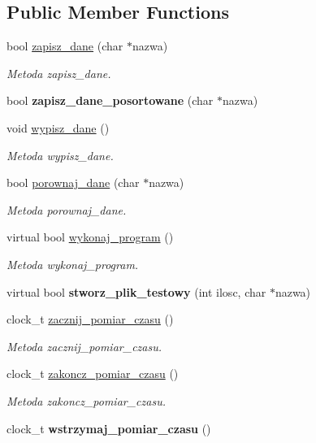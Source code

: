 \subsection*{Public Member Functions}
\begin{DoxyCompactItemize}
\item 
bool \hyperlink{class_program_aaef7fcaf64830eb231cbb9e887d705af}{zapisz\+\_\+dane} (char $\ast$nazwa)
\begin{DoxyCompactList}\small\item\em Metoda zapisz\+\_\+dane. \end{DoxyCompactList}\item 
\hypertarget{class_program_a320c378a3507881d2d62bbd0c8ea07d9}{bool {\bfseries zapisz\+\_\+dane\+\_\+posortowane} (char $\ast$nazwa)}\label{class_program_a320c378a3507881d2d62bbd0c8ea07d9}

\item 
void \hyperlink{class_program_a060ea3afebf696152d50135d20856e5a}{wypisz\+\_\+dane} ()
\begin{DoxyCompactList}\small\item\em Metoda wypisz\+\_\+dane. \end{DoxyCompactList}\item 
bool \hyperlink{class_program_ab5441e0e8ecd02ffeada4d77aaad2726}{porownaj\+\_\+dane} (char $\ast$nazwa)
\begin{DoxyCompactList}\small\item\em Metoda porownaj\+\_\+dane. \end{DoxyCompactList}\item 
virtual bool \hyperlink{class_program_ac396401ba5cade863d0e6acb727bec4e}{wykonaj\+\_\+program} ()
\begin{DoxyCompactList}\small\item\em Metoda wykonaj\+\_\+program. \end{DoxyCompactList}\item 
\hypertarget{class_program_a7fa8a33fb88f842b544e6d65c23022c3}{virtual bool {\bfseries stworz\+\_\+plik\+\_\+testowy} (int ilosc, char $\ast$nazwa)}\label{class_program_a7fa8a33fb88f842b544e6d65c23022c3}

\item 
clock\+\_\+t \hyperlink{class_program_ab68c69977637eb8cc05a57e176a21986}{zacznij\+\_\+pomiar\+\_\+czasu} ()
\begin{DoxyCompactList}\small\item\em Metoda zacznij\+\_\+pomiar\+\_\+czasu. \end{DoxyCompactList}\item 
clock\+\_\+t \hyperlink{class_program_a3515568f8df7224bfd8fd8b7b76ab0ba}{zakoncz\+\_\+pomiar\+\_\+czasu} ()
\begin{DoxyCompactList}\small\item\em Metoda zakoncz\+\_\+pomiar\+\_\+czasu. \end{DoxyCompactList}\item 
\hypertarget{class_program_aac837dd96e761e55fd3faa2b197635fc}{clock\+\_\+t {\bfseries wstrzymaj\+\_\+pomiar\+\_\+czasu} ()}\label{class_program_aac837dd96e761e55fd3faa2b197635fc}


\end{DoxyCompactItemize}

